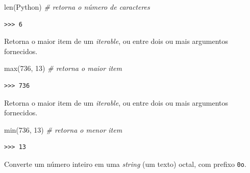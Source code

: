 \documentclass[
]{book}
\newenvironment{Shaded}{\begin{snugshade}}{\end{snugshade}}
\newcommand{\BuiltInTok}[1]{#1}
\newcommand{\CommentTok}[1]{\textcolor[rgb]{0.56,0.35,0.01}{\textit{#1}}}
\newcommand{\DecValTok}[1]{\textcolor[rgb]{0.00,0.00,0.81}{#1}}
\newcommand{\NormalTok}[1]{#1}
\newcommand{\StringTok}[1]{\textcolor[rgb]{0.31,0.60,0.02}{#1}}
\providecommand{\tightlist}{%
  \setlength{\itemsep}{0pt}\setlength{\parskip}{0pt}}
\begin{document}
\begin{Shaded}
\begin{Highlighting}[]
\BuiltInTok{len}\NormalTok{(}\StringTok{\textquotesingle{}Python\textquotesingle{}}\NormalTok{) }\CommentTok{\# retorna o número de caracteres}
\end{Highlighting}
\end{Shaded}

\begin{verbatim}
>>> 6
\end{verbatim}

\begin{description}
\tightlist
\item[\texttt{max(arg0,\ *arg1)}]
Retorna o maior item de um \emph{iterable}, ou entre dois ou mais argumentos fornecidos.
\end{description}

\begin{Shaded}
\begin{Highlighting}[]
\BuiltInTok{max}\NormalTok{(}\DecValTok{736}\NormalTok{, }\DecValTok{13}\NormalTok{) }\CommentTok{\# retorna o maior item}
\end{Highlighting}
\end{Shaded}

\begin{verbatim}
>>> 736
\end{verbatim}

\begin{description}
\tightlist
\item[\texttt{min(arg0,\ *arg1)}]
Retorna o maior item de um \emph{iterable}, ou entre dois ou mais argumentos fornecidos.
\end{description}

\begin{Shaded}
\begin{Highlighting}[]
\BuiltInTok{min}\NormalTok{(}\DecValTok{736}\NormalTok{, }\DecValTok{13}\NormalTok{) }\CommentTok{\# retorna o menor item}
\end{Highlighting}
\end{Shaded}

\begin{verbatim}
>>> 13
\end{verbatim}

\begin{description}
\tightlist
\item[\texttt{oct(x)}]
Converte um número inteiro em uma \emph{string} (um texto) octal, com prefixo \texttt{0o}.
\end{description}
\end{document}
